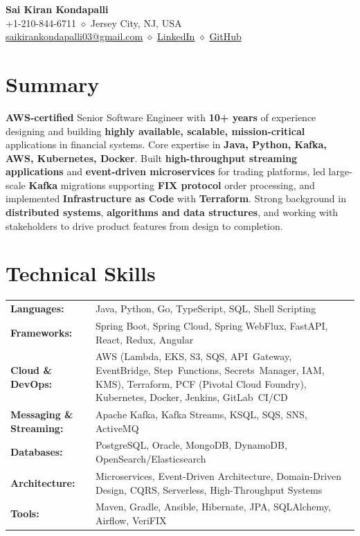 \documentclass[11pt,a4paper]{article}
\newcommand{\resumeHeader}[4]{
    \begin{center}
        {\Huge\bfseries #1}\\[0.3cm]
        #2 \quad $\diamond$ \quad #3\\[0.15cm]
        #4
    \end{center}
}
\begin{document}

\resumeHeader{Sai Kiran Kondapalli}
{+1-210-844-6711}
{Jersey City, NJ, USA}
{\href{mailto:saikirankondapalli03@gmail.com}{saikirankondapalli03@gmail.com} \quad $\diamond$ \quad \href{https://www.linkedin.com/in/saikirankondapalli}{LinkedIn} \quad $\diamond$ \quad \href{https://github.com/saikirankondapalli}{GitHub}}

\section{Summary}
\small\raggedright{\textbf{AWS-certified} Senior Software Engineer with \textbf{10+ years} of experience designing and building \textbf{highly available, scalable, mission-critical} applications in financial systems. Core expertise in \textbf{Java, Python, Kafka, AWS, Kubernetes, Docker}. Built \textbf{high-throughput streaming applications} and \textbf{event-driven microservices} for trading platforms, led large-scale \textbf{Kafka} migrations supporting \textbf{FIX protocol} order processing, and implemented \textbf{Infrastructure as Code} with \textbf{Terraform}. Strong background in \textbf{distributed systems}, \textbf{algorithms and data structures}, and working with stakeholders to drive product features from design to completion.}

\section{Technical Skills}
\renewcommand{\arraystretch}{1.1}
\begin{tabularx}{\textwidth}{@{}lX@{}}
    \textbf{Languages:} & Java, Python, Go, TypeScript, SQL, Shell Scripting\\
    \textbf{Frameworks:} & Spring Boot, Spring Cloud, Spring WebFlux, FastAPI, React, Redux, Angular\\
    \textbf{Cloud \& DevOps:} & AWS (Lambda, EKS, S3, SQS, API~Gateway, EventBridge, Step~Functions, Secrets~Manager, IAM, KMS), Terraform, PCF (Pivotal Cloud Foundry), Kubernetes, Docker, Jenkins, GitLab~CI/CD\\
    \textbf{Messaging \& Streaming:} & Apache Kafka, Kafka Streams, KSQL, SQS, SNS, ActiveMQ\\
    \textbf{Databases:} & PostgreSQL, Oracle, MongoDB, DynamoDB, OpenSearch/Elasticsearch\\
    \textbf{Architecture:} & Microservices, Event-Driven Architecture, Domain-Driven Design, CQRS, Serverless, High-Throughput Systems\\
    \textbf{Tools:} & Maven, Gradle, Ansible, Hibernate, JPA, SQLAlchemy, Airflow, VeriFIX\\
\end{tabularx}
\renewcommand{\arraystretch}{1}
\end{document}
